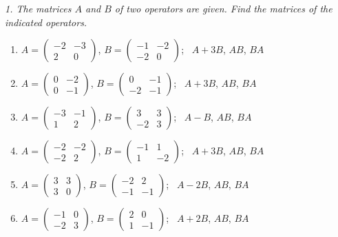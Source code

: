 \emph{1. The matrices $A$ and $B$ of two operators are given. Find the matrices of the indicated operators.}
\bigskip
\begin{enumerate}[label=\arabic*., leftmargin=*]
\item $A=\begin{pmatrix}-2 & -3\\ 2 & 0\end{pmatrix}$, $B=\begin{pmatrix}-1 & -2\\ -2 & 0\end{pmatrix}$; \ $A+3B$, $AB$, $BA$
\item $A=\begin{pmatrix}0 & -2\\ 0 & -1\end{pmatrix}$, $B=\begin{pmatrix}0 & -1\\ -2 & -1\end{pmatrix}$; \ $A+3B$, $AB$, $BA$
\item $A=\begin{pmatrix}-3 & -1\\ 1 & 2\end{pmatrix}$, $B=\begin{pmatrix}3 & 3\\ -2 & 3\end{pmatrix}$; \ $A-B$, $AB$, $BA$
\item $A=\begin{pmatrix}-2 & -2\\ -2 & 2\end{pmatrix}$, $B=\begin{pmatrix}-1 & 1\\ 1 & -2\end{pmatrix}$; \ $A+3B$, $AB$, $BA$
\item $A=\begin{pmatrix}3 & 3\\ 3 & 0\end{pmatrix}$, $B=\begin{pmatrix}-2 & 2\\ -1 & -1\end{pmatrix}$; \ $A-2B$, $AB$, $BA$
\item $A=\begin{pmatrix}-1 & 0\\ -2 & 3\end{pmatrix}$, $B=\begin{pmatrix}2 & 0\\ 1 & -1\end{pmatrix}$; \ $A+2B$, $AB$, $BA$

\end{enumerate}
